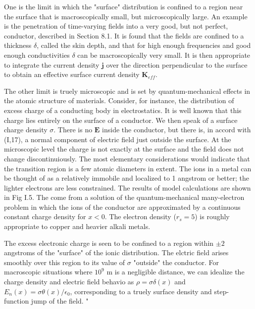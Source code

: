 \documentclass[11pt]{article}
\newcommand{\J}{\mathbf{j}}
\newcommand{\E}{\mathbf{E}}
\begin{document}
One is the limit in which the "surface" distribution is confined to a region near the surface that is macroscopically small, but microscopically large. An example is the penetration of time-varying fields into a very good, but not perfect, conductor, described in Section 8.1. It is found that the fields are confined to a thickness $\delta$, called the skin depth, and that for high enough frequencies and good enough conductivities $\delta$ can be macroscopically very small. It is then appropriate to integrate the current density $\J$ over the direction perpendicular to the surface to obtain an effective surface current density $\mathbf{K}_{eff}$.

The other limit is truely microscopic and is set by quantum-mechanical effects in the atomic structure of materials. Consider, for instance, the distribution of excess charge of a conducting body in electrostatics. It is well known that this charge lies entirely on the surface of a conductor. We then speak of a surface charge density $\sigma$. There is no $\E$ inside the conductor, but there is, in accord with (I,17), a normal component of electric field just outside the surface. At the microscopic level the charge is not exactly at the surface and the field does not change discontinuiously. The most elementary considerations would indicate that the transition region is a few atomic diameters in extent. The ions in a metal can be thought of as a relatively immobile and localized to 1 angstrom or better; the lighter electrons are less constrained. The results of model calculations are shown in Fig I.5. The come from a solution of the quantum-mechanical many-electron problem in which the ions of the conductor are approximated by a continuous constant charge density for $x<0$. The electron density ($r_s=5$) is roughly appropriate to copper and heavier alkali metals.

The excess electronic charge is seen to be confined to a region within $\pm 2$ angstroms of the "surface" of the ionic distribution. The elctric field arises smoothly over this region to its value of $\sigma$ "outside" the conductor. For macroscopic situations where $10^9$ m is a negligible distance, we can idealize the charge density and electric field behavio as $\rho = \sigma \delta(x)$ and $E_n(x) = \sigma \theta(x)/\epsilon_0$, corresponding to a truely surface density and step-function jump of the field.
"
\end{document}
